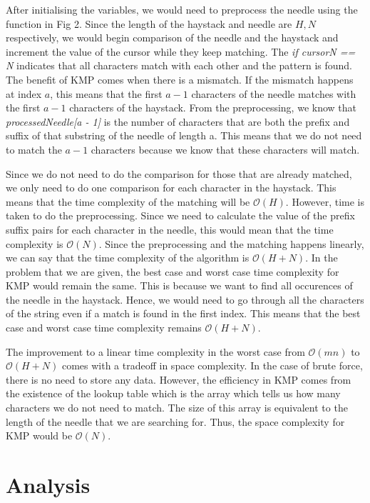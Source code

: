 After initialising the variables, we would need to preprocess the needle using the function in Fig 2. Since the length of the haystack and needle are $H, N$ respectively, we would begin comparison of the needle and the haystack and increment the value of the cursor while they keep matching. The \emph{if cursorN == N} indicates that all characters match with each other and the pattern is found. The benefit of KMP comes when there is a mismatch. If the mismatch happens at index $a$, this means that the first $a - 1$ characters of the needle matches with the first $a - 1$ characters of the haystack. From the preprocessing, we know that \emph{processedNeedle[a - 1]} is the number of characters that are both the prefix and suffix of that substring of the needle of length a. This means that we do not need to match the $a - 1$ characters because we know that these characters will match.

Since we do not need to do the comparison for those that are already matched, we only need to do one comparison for each character in the haystack. This means that the time complexity of the matching will be $\mathcal{O}(H)$. However, time is taken to do the preprocessing. Since we need to calculate the value of the prefix suffix pairs for each character in the needle, this would mean that the time complexity is $\mathcal{O}(N)$. Since the preprocessing and the matching happens linearly, we can say that the time complexity of the algorithm is $\mathcal{O}(H+N)$. In the problem that we are given, the best case and worst case time complexity for KMP would remain the same. This is because we want to find all occurences of the needle in the haystack. Hence, we would need to go through all the characters of the string even if a match is found in the first index. This means that the best case and worst case time complexity remains $\mathcal{O}(H+N)$.

The improvement to a linear time complexity in the worst case from $\mathcal{O}(mn)$ to $\mathcal{O}(H + N)$ comes with a tradeoff in space complexity. In the case of brute force, there is no need to store any data. However, the efficiency in KMP comes from the existence of the lookup table which is the array which tells us how many characters we do not need to match. The size of this array is equivalent to the length of the needle that we are searching for. Thus, the space complexity for KMP would be $\mathcal{O}(N)$.

\section*{Analysis}
